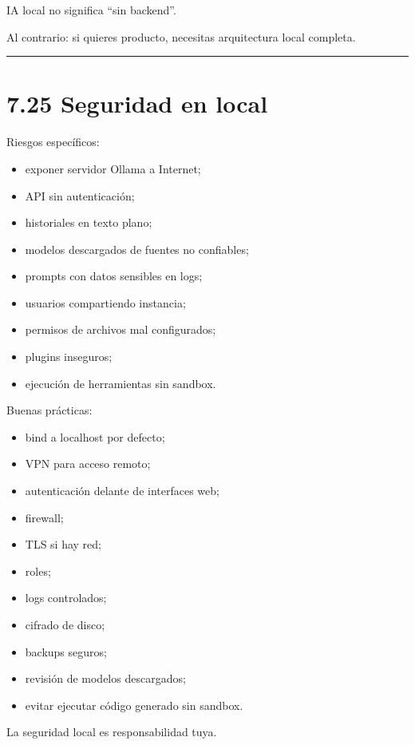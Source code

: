 IA local no significa ``sin backend''.

Al contrario: si quieres producto, necesitas arquitectura local
completa.

\begin{center}\rule{0.5\linewidth}{0.5pt}\end{center}

\section{7.25 Seguridad en local}\label{seguridad-en-local}

Riesgos específicos:

\begin{itemize}
\tightlist
\item
  exponer servidor Ollama a Internet;
\item
  API sin autenticación;
\item
  historiales en texto plano;
\item
  modelos descargados de fuentes no confiables;
\item
  prompts con datos sensibles en logs;
\item
  usuarios compartiendo instancia;
\item
  permisos de archivos mal configurados;
\item
  plugins inseguros;
\item
  ejecución de herramientas sin sandbox.
\end{itemize}

Buenas prácticas:

\begin{itemize}
\tightlist
\item
  bind a localhost por defecto;
\item
  VPN para acceso remoto;
\item
  autenticación delante de interfaces web;
\item
  firewall;
\item
  TLS si hay red;
\item
  roles;
\item
  logs controlados;
\item
  cifrado de disco;
\item
  backups seguros;
\item
  revisión de modelos descargados;
\item
  evitar ejecutar código generado sin sandbox.
\end{itemize}

La seguridad local es responsabilidad tuya.

